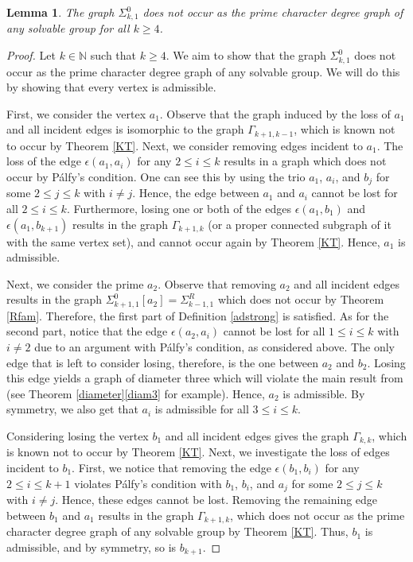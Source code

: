 \documentclass[11pt]{amsart}
\newtheorem{lemma}[theorem]{Lemma}
\theoremstyle{definition}
\theoremstyle{remark}
\numberwithin{equation}{section}
\newcommand{\SR}[2]{\Sigma_{#1,#2}^R} %
\newcommand{\SZ}[2]{\Sigma_{#1,#2}^0} %
\begin{document}
\begin{lemma}\label{lemk10}
The graph $\SZ{k}{1}$ does not occur as the prime character degree graph of any solvable group for all $k \geq 4$.
\end{lemma}
\begin{proof}
Let $k\in\mathbb{N}$ such that $k\geq 4$. We aim to show that the graph $\SZ{k}{1}$ does not occur as the prime character degree graph of any solvable group. We will do this by showing that every vertex is admissible.

First, we consider the vertex $a_1$. Observe that the graph induced by the loss of $a_1$ and all incident edges is isomorphic to the graph $\Gamma_{k+1,k-1}$, which is known not to occur by Theorem \ref{KT}. Next, we consider removing edges incident to $a_1$. The loss of the edge $\epsilon(a_1,a_i)$ for any $2\leq i\leq k$ results in a graph which does not occur by P\'alfy's condition. One can see this by using the trio $a_1$, $a_i$, and $b_j$ for some $2\leq j\leq k$ with $i\neq j$. Hence, the edge between $a_1$ and $a_i$ cannot be lost for all $2\leq i\leq k$. Furthermore, losing one or both of the edges $\epsilon(a_1,b_1)$ and $\epsilon(a_1,b_{k+1})$ results in the graph $\Gamma_{k+1,k}$ (or a proper connected subgraph of it with the same vertex set), and cannot occur again by Theorem \ref{KT}. Hence, $a_1$ is admissible.

Next, we consider the prime $a_2$. Observe that removing $a_2$ and all incident edges results in the graph $\SZ{k+1}{1}[a_2]=\SR{k-1}{1}$ which does not occur by Theorem \ref{Rfam}. Therefore, the first part of Definition \ref{adstrong} is satisfied. As for the second part, notice that the edge $\epsilon(a_2,a_i)$ cannot be lost for all $1\leq i\leq k$ with $i\neq2$ due to an argument with P\'alfy's condition, as considered above. The only edge that is left to consider losing, therefore, is the one between $a_2$ and $b_2$. Losing this edge yields a graph of diameter three which will violate the main result from \cite{S} (see Theorem \ref{diameter}\eqref{diam3} for example). Hence, $a_2$ is admissible. By symmetry, we also get that $a_i$ is admissible for all $3\leq i\leq k$.

Considering losing the vertex $b_1$ and all incident edges gives the graph $\Gamma_{k,k}$, which is known not to occur by Theorem \ref{KT}. Next, we investigate the loss of edges incident to $b_1$. First, we notice that removing the edge $\epsilon(b_1,b_i)$ for any $2\leq i\leq k+1$ violates P\'alfy's condition with $b_1$, $b_i$, and $a_j$ for some $2\leq j\leq k$ with $i\neq j$. Hence, these edges cannot be lost. Removing the remaining edge between $b_1$ and $a_1$ results in the graph $\Gamma_{k+1,k}$, which does not occur as the prime character degree graph of any solvable group by Theorem \ref{KT}. Thus, $b_1$ is admissible, and by symmetry, so is $b_{k+1}$.


\end{proof}
\end{document}
